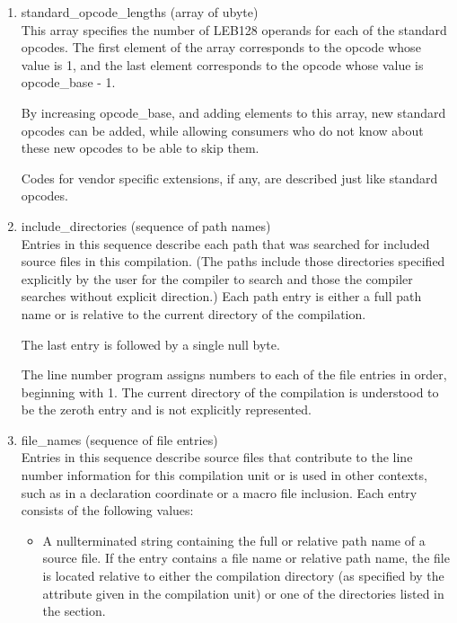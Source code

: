 \begin{enumerate}[1.]
\item standard\_opcode\_lengths (array of ubyte) \\
This array specifies the number of LEB128 operands for each
of the standard opcodes. The first element of the array
corresponds to the opcode whose value is 1, and the last
element corresponds to the opcode whose value 
is opcode\_base - 1.

By increasing opcode\_base, and adding elements to this array,
new standard opcodes can be added, while allowing consumers who
do not know about these new opcodes to be able to skip them.

Codes for vendor specific extensions, if any, are described
just like standard opcodes.

\item include\_directories (sequence of path names) \\
Entries 
in this sequence describe each path that was searched
for included source files in this compilation. (The paths
include those directories specified explicitly by the user for
the compiler to search and those the compiler searches without
explicit direction.) Each path entry is either a full path name
or is relative to the current directory of the compilation.

The last entry is followed by a single null byte.

The line number program assigns numbers to each of the file
entries in order, beginning with 1. The current directory of
the compilation is understood to be the zeroth entry and is
not explicitly represented.

\item  file\_names (sequence of file entries) \\
Entries 
in 
this sequence describe source files that contribute
to the line number information for this compilation unit or is
used in other contexts, such as in a declaration coordinate or
a macro file inclusion. Each entry consists of the following
values:


\begin{itemize}
\item A null\dash terminated string containing the full or relative
path name of a source file. If the entry contains a file
name or relative path name, the file is located relative
to either the compilation directory (as specified by the
 attribute given in the compilation unit) or one
of the directories listed in the 
 section.


\end{itemize}
\end{enumerate}
